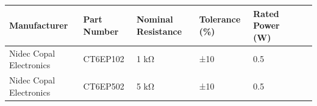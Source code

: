 \begin{tabular}{lllllcc}
Manufacturer & Part Number  & Nominal Resistance & Tolerance (\%) & Rated Power (W) \\
\hline
Nidec Copal Electronics     & CT6EP102  & 1 kΩ  & ±10           & 0.5 \\
Nidec Copal Electronics     & CT6EP502  & 5 kΩ  & ±10           & 0.5 \\
\hline
\end{tabular}